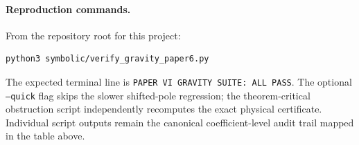 \documentclass[11pt]{article}
\theoremstyle{definition}
\theoremstyle{remark}
\begin{document}
\paragraph{Reproduction commands.}
From the repository root for this project:
\begin{verbatim}
python3 symbolic/verify_gravity_paper6.py
\end{verbatim}
The expected terminal line is
\texttt{PAPER VI GRAVITY SUITE: ALL PASS}.  The optional
\texttt{--quick} flag skips the slower shifted-pole regression; the
theorem-critical obstruction script independently recomputes the exact
physical certificate.  Individual script outputs remain the canonical
coefficient-level audit trail mapped in the table above.
\end{document}
